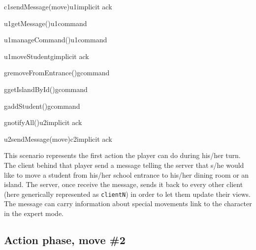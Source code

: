 \documentclass[a4paper]{article}
\begin{document}
	\begin{center}
		\begin{sequencediagram}

			\begin{call}{c1}{sendMessage(move)}{u1}{implicit ack}
				\begin{call}{u1}{getMessage()}{u1}{command}
				\end{call}
				\begin{call}{u1}{manageCommand()}{u1}{command}
				\end{call}
				\begin{call}{u1}{moveStudent}{g}{implicit ack}
					\begin{call}{g}{removeFromEntrance()}{g}{command}
					\end{call}
					\begin{call}{g}{getIslandById()}{g}{command}
					\end{call}
					\begin{call}{g}{addStudent()}{g}{command}
					\end{call}
					\begin{call}{g}{notifyAll()}{u2}{implicit ack}
						\begin{call}{u2}{sendMessage(move)}{c2}{implicit ack}
						\end{call}
					\end{call}
				\end{call}
			\end{call}
		\end{sequencediagram}
	\end{center}

	This scenario represents the first action the player can do during his/her turn. The client behind that player send a message telling the server that s/he would like to move a student from his/her school entrance to his/her dining room or an island. The server, once receive the message, sends it back to every other client (here generically represented as \verb|clientN|) in order to let them update their views. The message can carry information about special movements link to the character in the expert mode.

	\pagebreak

	\subsection{Action phase, move \#2}
\end{document}
